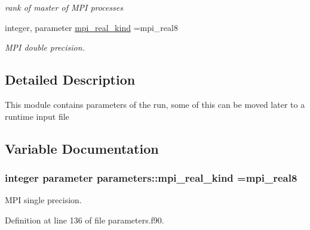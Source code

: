 \begin{DoxyCompactItemize}
\begin{DoxyCompactList}\small\item\em rank of master of M\+P\+I processes \end{DoxyCompactList}\item 
integer, parameter \hyperlink{namespaceparameters_a406c7844e3ea27cce4fa7abbe9149955}{mpi\+\_\+real\+\_\+kind} =mpi\+\_\+real8
\begin{DoxyCompactList}\small\item\em M\+P\+I double precision. \end{DoxyCompactList}\end{DoxyCompactItemize}


\subsection{Detailed Description}
This module contains parameters of the run, some of this can be moved later to a runtime input file 

\subsection{Variable Documentation}
\hypertarget{namespaceparameters_a406c7844e3ea27cce4fa7abbe9149955}{}
\subsubsection[{mpi\+\_\+real\+\_\+kind}]{\setlength{\rightskip}{0pt plus 5cm}integer parameter parameters\+::mpi\+\_\+real\+\_\+kind =mpi\+\_\+real8}\label{namespaceparameters_a406c7844e3ea27cce4fa7abbe9149955}
M\+P\+I single precision. 

Definition at line 136 of file parameters.\+f90.

